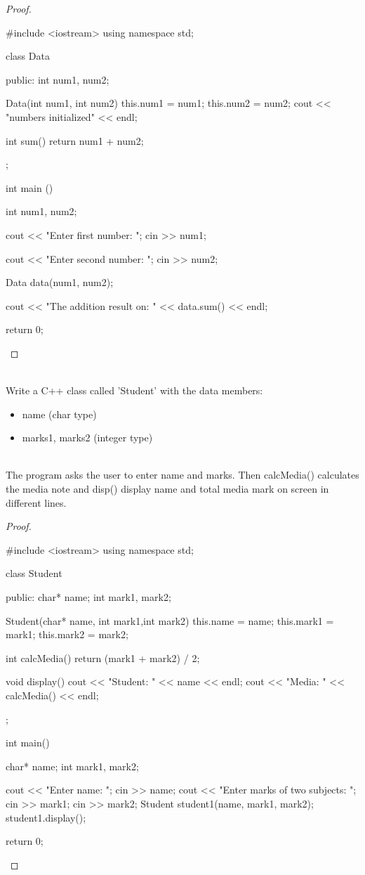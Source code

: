 \documentclass[12pt]{article}
\newenvironment{problem}[2][Problem]{\begin{trivlist}
\item[\hskip \labelsep {\bfseries #1}\hskip \labelsep {\bfseries #2.}]}{\end{trivlist}}
\begin{document}
\begin{proof}
\begin{cppcode}[]
#include <iostream>
using namespace std;

class Data
{
    public:
        int num1, num2;

        Data(int num1, int num2)
        {
            this.num1 = num1;
            this.num2 = num2;
            cout << "numbers initialized" << endl;
        }

        int sum()
        {
            return num1 + num2;
        }
};

int main ()
{
    int num1, num2;

    cout << "Enter first number: ";
    cin >> num1;

    cout << "Enter second number: ";
    cin >> num2;

    Data data(num1, num2);

    cout << "The addition result on: " << data.sum() << endl;

    return 0;
}
\end{cppcode}
\end{proof}


\begin{problem}{3}
\text{ }\\
Write a C++ class called 'Student' with the data members:
\begin{itemize}
    \item name (char type)
    \item marks1, marks2 (integer type)
\end{itemize}

\text{ }\\
The program asks the user to enter name and marks. Then calcMedia() calculates the media note and disp() display name and total media mark on screen in different lines.
\end{problem}

\begin{proof}
\begin{cppcode}[]
#include <iostream>
using namespace std;

class Student
{
    public:
        char* name;
        int mark1, mark2;

        Student(char* name, int mark1,int mark2)
        {
            this.name = name;
            this.mark1 = mark1;
            this.mark2 = mark2;
        }

        int calcMedia()
        {
            return (mark1 + mark2) / 2;
        }

        void display()
        {
            cout << "Student: " << name << endl;
            cout << "Media: " << calcMedia() << endl;
        }
};

int main()
{
    char* name;
    int mark1, mark2;

    cout << "Enter name: ";
    cin >> name;
    cout << "Enter marks of two subjects: ";
    cin >> mark1;
    cin >> mark2;
    Student student1(name, mark1, mark2);
    student1.display();

    return 0;
}
\end{cppcode}
\end{proof}
\end{document}
